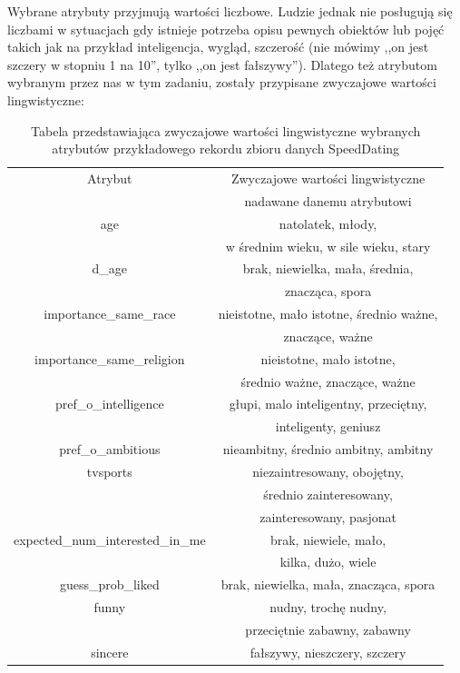 \documentclass{classrep}
\begin{document}
Wybrane atrybuty przyjmują wartości liczbowe. Ludzie jednak nie posługują się liczbami w sytuacjach gdy istnieje potrzeba opisu pewnych obiektów lub pojęć takich jak na przykład inteligencja, wygląd, szczerość (nie mówimy ,,on jest szczery w stopniu 1 na 10'', tylko ,,on jest fałszywy''). Dlatego też atrybutom wybranym przez nas w tym zadaniu, zostały przypisane zwyczajowe wartości lingwistyczne:
\begin{table}[H]
\centering
\begin{tabular}{|c|c|}
\hline
Atrybut & Zwyczajowe wartości lingwistyczne \\ & nadawane danemu atrybutowi \\ \hline
age & natolatek, młody, \\ & w średnim wieku, w sile wieku, stary \\ \hline
d\_age & brak, niewielka, mała, średnia,\\ &  znacząca, spora \\ \hline
importance\_same\_race & nieistotne, mało istotne, średnio ważne, \\ & znaczące, ważne \\ \hline
importance\_same\_religion & nieistotne, mało istotne, \\ & średnio ważne, znaczące, ważne \\ \hline
pref\_o\_intelligence & głupi, malo inteligentny, przeciętny, \\ & inteligenty, geniusz \\ \hline
pref\_o\_ambitious & nieambitny, średnio ambitny, ambitny \\ \hline
tvsports & niezaintresowany, obojętny, \\ & średnio zainteresowany, \\ & zainteresowany, pasjonat \\ \hline
expected\_num\_interested\_in\_me & brak, niewiele, mało, \\ & kilka, dużo, wiele \\ \hline
guess\_prob\_liked & brak, niewielka, mała, znacząca, spora \\ \hline
funny & nudny, trochę nudny, \\ & przeciętnie zabawny, zabawny \\ \hline
sincere & fałszywy, nieszczery, szczery \\ \hline
\end{tabular}
\caption{Tabela przedstawiająca zwyczajowe wartości lingwistyczne wybranych atrybutów przykładowego rekordu zbioru danych SpeedDating \cite{database}}
\end{table}
\end{document}
